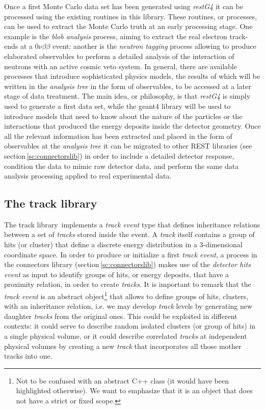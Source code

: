 Once a first Monte Carlo data set has been generated using \emph{restG4} it can be processed using the existing routines in this library. These routines, or processes, can be used to extract the Monte Carlo truth at an early processing stage. One example is the \emph{blob analysis} process, aiming to extract the real electron track-ends at a $0\nu\beta\beta$ event: another is the \emph{neutron tagging} process allowing to produce elaborated observables to perform a detailed analysis of the interaction of neutrons with an active cosmic veto system. In general, there are available processes that introduce sophisticated physics models, the results of which will be written in the \emph{analysis tree} in the form of observables, to be accessed at a later stage of data treatment. The main idea, or philosophy, is that \emph{restG4} is simply used to generate a first data set, while the geant4 library will be used to introduce models that need to know about the nature of the particles or the interactions that produced the energy deposits inside the detector geometry. Once all the relevant information has been extracted and placed in the form of observables at the \emph{analysis tree} it can be migrated to other REST libraries (see section\,\ref{sc:connectorslib}) in order to include a detailed detector response, condition the data to mimic raw detector data, and perform the same data analysis processing applied to real experimental data.

\subsection{The track library}\label{sc:tracklib}

The track library\,\cite{REST_Track_Git} implements a \emph{track event} type that defines inheritance relations between a set of \emph{tracks} stored inside the event. A \emph{track} itself contains a group of hits (or cluster) that define a discrete energy distribution in a 3-dimensional coordinate space. In order to produce or initialize a first \emph{track event}, a process in the connectors library (section\,\ref{sc:connectorslib}) makes use of the \emph{detector hits event} as input to identify groups of hits, or energy deposits, that have a proximity relation, in order to create \emph{tracks}. It is important to remark that the \emph{track event} is an abstract object\footnote{Not to be confused with an abstract C++ class (it would have been highlighted otherwise). We want to emphasize that it is an object that does not have a strict or fixed scope.} that allows to define groups of hits, clusters, with an inheritance relation, i.e. we may develop \emph{track} levels by generating new daughter \emph{tracks} from the original ones. This could be exploited in different contexts: it could serve to describe random isolated clusters (or group of hits) in a single physical volume, or it could describe correlated \emph{tracks} at independent physical volumes by creating a new \emph{track} that incorporates all those mother tracks into one.

